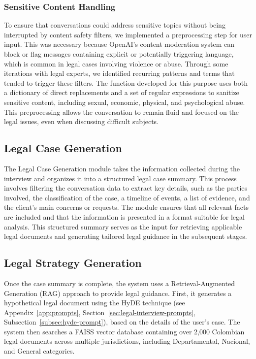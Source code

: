 \subsubsection{Sensitive Content Handling}
To ensure that conversations could address sensitive topics without being interrupted by content safety filters, 
we implemented a preprocessing step for user input. This was necessary because OpenAI's content moderation system 
can block or flag messages containing explicit or potentially triggering language, which is common in legal cases 
involving violence or abuse. Through some iterations with legal experts, we identified recurring patterns and terms 
that tended to trigger these filters. The function developed for this purpose uses both a dictionary of direct replacements 
and a set of regular expressions to sanitize sensitive content, including sexual, economic, 
physical, and psychological abuse. This preprocessing allows the conversation to remain fluid and focused on the legal issues, 
even when discussing difficult subjects.

\subsection{Legal Case Generation}
The Legal Case Generation module takes the information collected during the interview and organizes it into a structured legal case summary. 
This process involves filtering the conversation data to extract key details, such as the parties involved, the classification of the case, 
a timeline of events, a list of evidence, and the client's main concerns or requests. The module ensures that all relevant facts are included 
and that the information is presented in a format suitable for legal analysis. This structured summary serves as the input for retrieving 
applicable legal documents and generating tailored legal guidance in the subsequent stages.

\subsection{Legal Strategy Generation}
Once the case summary is complete, the system uses a Retrieval-Augmented Generation (RAG) approach to provide legal guidance. 
First, it generates a hypothetical legal document using the HyDE technique 
(see Appendix~\ref{app:prompts}, Section~\ref{sec:legal-interview-prompts}, Subsection~\ref{subsec:hyde-prompt}), 
based on the details of the user's case. The system then searches a 
FAISS vector database containing over 2,000 Colombian legal documents across multiple jurisdictions, including Departamental, Nacional, and 
General categories.

